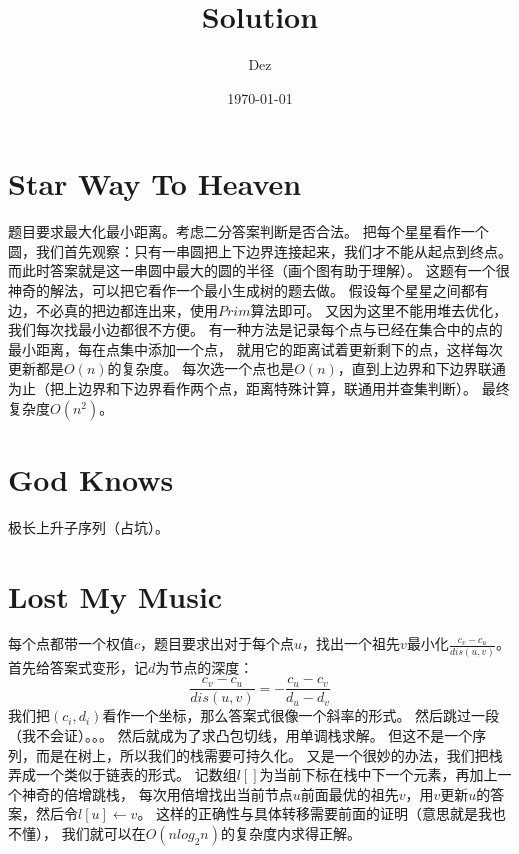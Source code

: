 \documentclass{article}
\title{Solution}
\author{Dez}
\date{\today}
\begin{document}
\maketitle

\section{Star Way To Heaven}
题目要求最大化最小距离。考虑二分答案判断是否合法。
把每个星星看作一个圆，我们首先观察：只有一串圆把上下边界连接起来，我们才不能从起点到终点。
而此时答案就是这一串圆中最大的圆的半径（画个图有助于理解）。
这题有一个很神奇的解法，可以把它看作一个最小生成树的题去做。
假设每个星星之间都有边，不必真的把边都连出来，使用$Prim$算法即可。
又因为这里不能用堆去优化，我们每次找最小边都很不方便。
有一种方法是记录每个点与已经在集合中的点的最小距离，每在点集中添加一个点，
就用它的距离试着更新剩下的点，这样每次更新都是$O(n)$的复杂度。
每次选一个点也是$O(n)$，直到上边界和下边界联通为止（把上边界和下边界看作两个点，距离特殊计算，联通用并查集判断）。
最终复杂度$O(n^2)$。

\section{God Knows}
极长上升子序列（占坑）。

\section{Lost My Music}
每个点都带一个权值$c$，题目要求出对于每个点$u$，找出一个祖先$v$最小化$\frac{c_v-c_u}{dis(u,v)}$。
首先给答案式变形，记$d$为节点的深度：
$$\frac{c_v-c_u}{dis(u,v)} = -\frac{c_u-c_v}{d_u-d_v}$$
我们把$(c_i,d_i)$看作一个坐标，那么答案式很像一个斜率的形式。
\newline 然后跳过一段（我不会证）。。。\newline
然后就成为了求凸包切线，用单调栈求解。
但这不是一个序列，而是在树上，所以我们的栈需要可持久化。
又是一个很妙的办法，我们把栈弄成一个类似于链表的形式。
记数组$l[]$为当前下标在栈中下一个元素，再加上一个神奇的倍增跳栈，
每次用倍增找出当前节点$u$前面最优的祖先$v$，用$v$更新$u$的答案，然后令$l[u]\leftarrow v$。
这样的正确性与具体转移需要前面的证明（意思就是我也不懂），
我们就可以在$O(nlog_2n)$的复杂度内求得正解。
\end{document}
